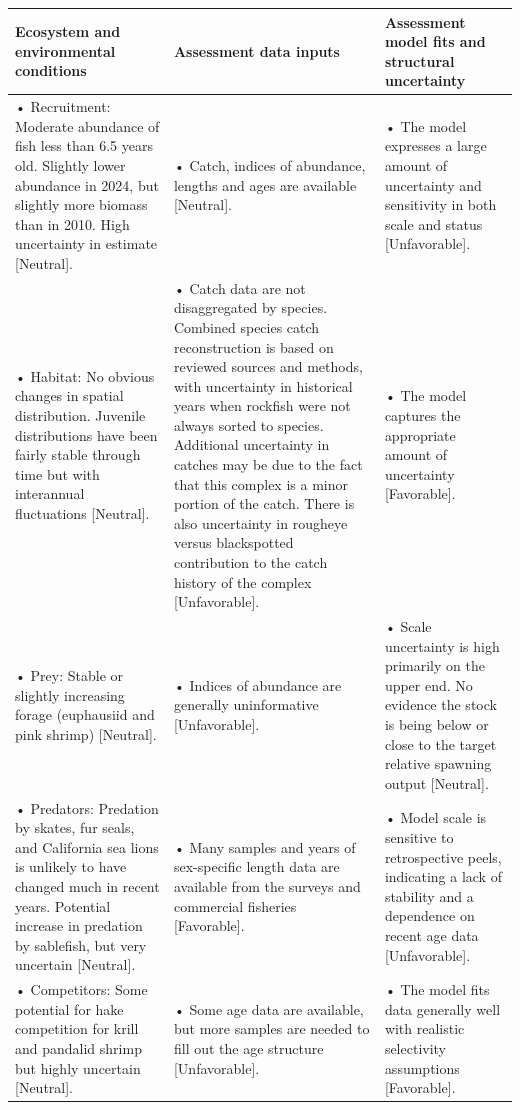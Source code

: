 \documentclass[
  english,
]{article}
\begin{document}
\begingroup
\fontsize{9.0pt}{11.0pt}\selectfont
\begin{longtable*}{>{\raggedright\arraybackslash}p{\dimexpr 150.00pt -2\arrayrulewidth}>{\raggedright\arraybackslash}p{\dimexpr 150.00pt -2\arrayrulewidth}>{\raggedright\arraybackslash}p{\dimexpr 150.00pt -2\arrayrulewidth}}
\toprule
Ecosystem and environmental conditions & Assessment data inputs & Assessment model fits and structural uncertainty \\ 
\midrule\addlinespace[2.5pt]
• Recruitment: Moderate abundance of fish less than 6.5 years old. Slightly lower abundance in 2024, but slightly more biomass than in 2010. High uncertainty in estimate [Neutral]. & • Catch, indices of abundance, lengths and ages are available [Neutral]. & • The model expresses a large amount of uncertainty and sensitivity in both scale and status [Unfavorable]. \\ 
• Habitat: No obvious changes in spatial distribution. Juvenile distributions have been fairly stable through time but with interannual fluctuations [Neutral]. & • Catch data are not disaggregated by species. Combined species catch reconstruction is based on reviewed sources and methods, with uncertainty in historical years when rockfish were not always sorted to species. Additional uncertainty in catches may be due to the fact that this complex is a minor portion of the catch. There is also uncertainty in rougheye versus blackspotted contribution to the catch history of the complex [Unfavorable]. & • The model captures the appropriate amount of uncertainty [Favorable]. \\ 
• Prey: Stable or slightly increasing forage (euphausiid and pink shrimp) [Neutral]. & • Indices of abundance are generally uninformative [Unfavorable]. & • Scale uncertainty is high primarily on the upper end. No evidence the stock is being below or close to the target relative spawning output [Neutral]. \\ 
• Predators: Predation by skates, fur seals, and California sea lions is unlikely to have changed much in recent years. Potential increase in predation by sablefish, but very uncertain [Neutral]. & • Many samples and years of sex-specific length data are available from the surveys and commercial fisheries [Favorable]. & • Model scale is sensitive to retrospective peels, indicating a lack of stability and a dependence on recent age data [Unfavorable]. \\ 
• Competitors: Some potential for hake competition for krill and pandalid shrimp but highly uncertain [Neutral]. & • Some age data are available, but more samples are needed to fill out the age structure [Unfavorable].  & • The model fits data generally well with realistic selectivity assumptions [Favorable]. \\ 

\end{longtable*}
\end{document}
